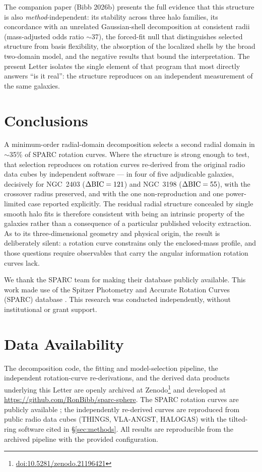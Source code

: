 \documentclass[twocolumn]{aastex701}
\newcommand{\dbic}{\Delta{\rm BIC}}
\providecommand{\doi}[1]{\href{https://doi.org/#1}{doi:#1}}
\begin{document}
The companion paper (Bibb 2026b) presents the full evidence that this structure is
also \emph{method}-independent: its stability across three halo families, its
concordance with an unrelated Gaussian-shell decomposition at consistent radii
(mass-adjusted odds ratio $\sim$37), the forced-fit null that distinguishes
selected structure from basis flexibility, the absorption of the localized shells
by the broad two-domain model, and the negative results that bound the
interpretation. The present Letter isolates the single element of that program
that most directly answers ``is it real'': the structure reproduces on an
independent measurement of the same galaxies.

\section{Conclusions} \label{sec:conclusions}

A minimum-order radial-domain decomposition selects a second radial domain in
$\sim$35\% of SPARC rotation curves. Where the structure is strong enough to test,
that selection reproduces on rotation curves re-derived from the original radio
data cubes by independent software --- in four of five adjudicable galaxies,
decisively for NGC~2403 ($\dbic = 121$) and NGC~3198 ($\dbic = 55$), with the
crossover radius preserved, and with the one non-reproduction and one
power-limited case reported explicitly. The residual radial structure concealed by
single smooth halo fits is therefore consistent with being an intrinsic property of the
galaxies rather than a consequence of a particular published velocity extraction. As to its three-dimensional
geometry and physical origin, the result is deliberately silent: a rotation curve
constrains only the enclosed-mass profile, and those questions require observables
that carry the angular information rotation curves lack.

\begin{acknowledgments}
We thank the SPARC team for making their database publicly available. This work
made use of the Spitzer Photometry and Accurate Rotation Curves (SPARC) database
\citep{Lelli2016}. This research was conducted independently, without
institutional or grant support.
\end{acknowledgments}

\section*{Data Availability} \label{sec:dataavail}
The decomposition code, the fitting and model-selection pipeline, the independent
rotation-curve re-derivations, and the derived data products underlying this Letter
are openly archived at Zenodo\footnote{\doi{10.5281/zenodo.21196421}} and developed at
\url{https://github.com/RonBibb/sparc-sphere}. The SPARC rotation curves are publicly
available \citep{Lelli2016}; the independently re-derived curves are reproduced from
public radio data cubes (THINGS, VLA-ANGST, HALOGAS) with the tilted-ring software
cited in \S\ref{sec:methods}. All results are reproducible from the archived
pipeline with the provided configuration.
\end{document}
